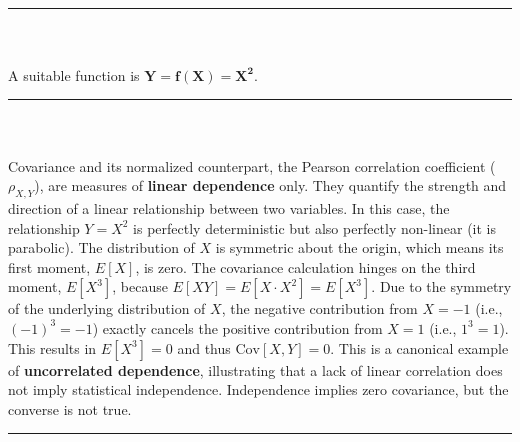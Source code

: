 \documentclass{article}
\begin{document}
\vspace{1em}
\noindent\rule{\textwidth}{0.4pt}\\

\subsubsection*{}
A suitable function is $\mathbf{Y = f(X) = X^2}$.

\vspace{1em}
\noindent\rule{\textwidth}{0.4pt}\\

\subsubsection*{}
\parbox{\textwidth}{
    Covariance and its normalized counterpart, the Pearson correlation coefficient ($\rho_{X,Y}$), are measures of \textbf{linear dependence} only. They quantify the strength and direction of a linear relationship between two variables. In this case, the relationship $Y=X^2$ is perfectly deterministic but also perfectly non-linear (it is parabolic). The distribution of $X$ is symmetric about the origin, which means its first moment, $E[X]$, is zero. The covariance calculation hinges on the third moment, $E[X^3]$, because $E[XY] = E[X \cdot X^2] = E[X^3]$. Due to the symmetry of the underlying distribution of $X$, the negative contribution from $X=-1$ (i.e., $(-1)^3 = -1$) exactly cancels the positive contribution from $X=1$ (i.e., $1^3 = 1$). This results in $E[X^3]=0$ and thus $\text{Cov}[X,Y]=0$. This is a canonical example of \textbf{uncorrelated dependence}, illustrating that a lack of linear correlation does not imply statistical independence. Independence implies zero covariance, but the converse is not true.
}

\vspace{1em}
\noindent\rule{\textwidth}{0.4pt}\\
\end{document}
